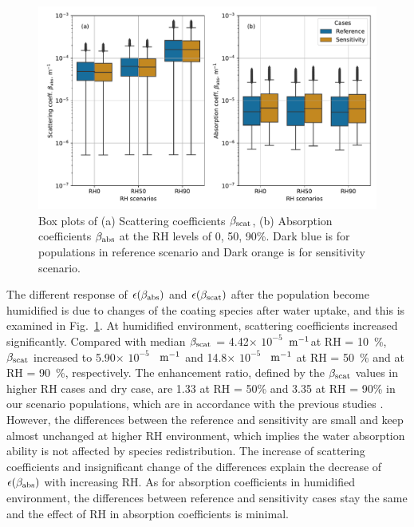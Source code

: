 \documentclass[edeposit,fullpage]{uiucthesis2009}
\makeatletter
\DeclareRobustCommand*\unit[1]
 {\ensuremath{%
   {\thinmuskip3mu\relax
    \def\mu{\text{\textmu}}\def~{\,}%
    \ifx\f@series\testbx\mathbf{#1}\else\mathrm{#1}\fi}}}
\makeatother
\begin{document}
\begin{figure}
	\centering
	\includegraphics[scale=0.50]{chap4_figs/fig9.pdf}
	\caption{Box plots of (a) Scattering coefficients $\beta_{\rm scat}$, 
	(b) Absorption coefficients $\beta_{\rm abs}$ at the RH levels of 0, 50, 90\%. Dark blue is for populations
	in reference scenario and Dark orange is for sensitivity scenario.}
	\label{fig10:RH90-RH10-opt-scat}
\end{figure}

The different response of $\epsilon(\beta_{\rm \rm abs})$ and
$\epsilon(\beta_{\rm \rm scat})$ after the population become
humidified is due to changes of the coating species after water
uptake, and this is examined in Fig.~\ref{fig10:RH90-RH10-opt-scat}. 
At humidified environment, scattering coefficients increased significantly.
Compared with median $\beta_{\rm scat}$ = 4.42$\times$
$10^{-5}$~\unit{m^{-1}}at RH = 10~\%, $\beta_{\rm scat}$ increased to
5.90$\times$ $10^{-5}$ ~\unit{m^{-1}} and 14.8$\times$ $10^{-5}$
~\unit{m^{-1}} at RH = 50~\% and at RH = 90~\%, respectively.
The enhancement ratio, defined by the $\beta_{\rm scat}$ values in higher RH cases
and dry case, are 1.33 at RH = 50\% and 3.35 at RH = 90\% in our
scenario populations, which are in accordance with the previous
studies \citep{Titos2016, Burgos2020}. However, the differences between the 
reference and sensitivity are small and keep almost unchanged at higher RH 
environment, which implies the water absorption ability is not affected by species redistribution. 
The increase of scattering coefficients and insignificant change of the differences explain the decrease of $\epsilon(\beta_{\rm \rm abs})$ with 
increasing RH. As for absorption coefficients in humidified environment, the differences 
between reference and sensitivity cases stay the same and the effect of RH in absorption coefficients 
is minimal. 
\end{document}
